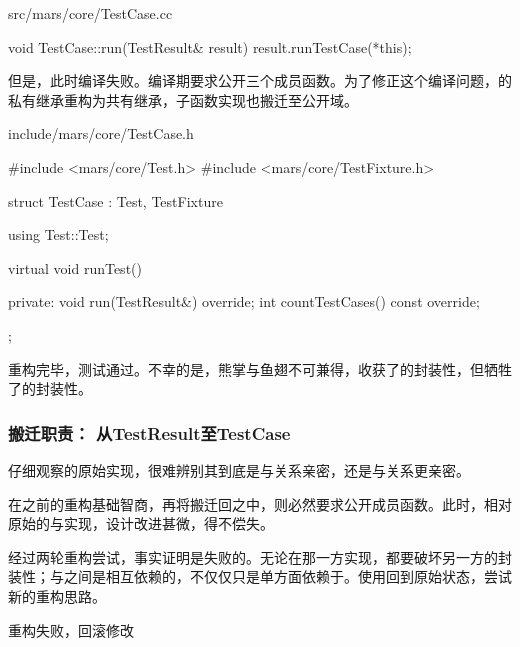 \begin{content}
\begin{nodiff}{src/mars/core/TestCase.cc}
 \begin{c++}
void TestCase::run(TestResult& result) {
  result.runTestCase(*this);
}
 \end{c++}
\end{nodiff}

但是，此时编译失败。编译期要求公开三个成员函数。为了修正这个编译问题，的私有继承重构为共有继承，子函数实现也搬迁至公开域。

\begin{nodiff}{include/mars/core/TestCase.h}
 \begin{c++}
#include <mars/core/Test.h>
#include <mars/core/TestFixture.h>

struct TestCase : Test, TestFixture {
  using Test::Test;

  virtual void runTest() {}

private:
  void run(TestResult&) override;
  int countTestCases() const override;
};
 \end{c++}
\end{nodiff}

重构完毕，测试通过。不幸的是，熊掌与鱼翅不可兼得，收获了的封装性，但牺牲了的封装性。

\subsubsection{搬迁职责： 从TestResult至TestCase}

仔细观察的原始实现，很难辨别其到底是与关系亲密，还是与关系更亲密。

在之前的重构基础智商，再将搬迁回之中，则必然要求公开成员函数。此时，相对原始的与实现，设计改进甚微，得不偿失。

经过两轮重构尝试，事实证明是失败的。无论在那一方实现，都要破坏另一方的封装性；与之间是相互依赖的，不仅仅只是单方面依赖于。使用回到原始状态，尝试新的重构思路。

\begin{nodiff}{重构失败，回滚修改}
\end{nodiff}


\end{content}
